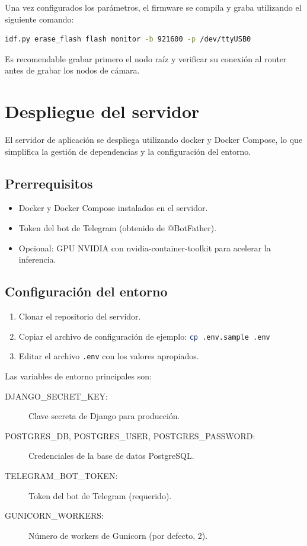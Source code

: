 \documentclass[a4paper, 12pt]{report}
\begin{document}
Una vez configurados los parámetros, el firmware se compila y graba
utilizando el siguiente comando:

\begin{lstlisting}[language=bash, caption={Comandos para compilar y grabar el firmware.}]
  idf.py erase_flash flash monitor -b 921600 -p /dev/ttyUSB0
\end{lstlisting}

Es recomendable grabar primero el nodo raíz y verificar su conexión al
router antes de grabar los nodos de cámara.

\section{Despliegue del servidor}

El servidor de aplicación se despliega utilizando \gls{docker} y
Docker Compose, lo que simplifica la gestión de dependencias y la
configuración del entorno.

\subsection{Prerrequisitos}

\begin{itemize}
  \item Docker y Docker Compose instalados en el servidor.
  \item Token del bot de Telegram (obtenido de @BotFather).
  \item Opcional: GPU NVIDIA con nvidia-container-toolkit para
    acelerar la inferencia.
\end{itemize}

\subsection{Configuración del entorno}

\begin{enumerate}
  \item Clonar el repositorio del servidor.
  \item Copiar el archivo de configuración de ejemplo:
    \lstinline[language=bash]{cp .env.sample .env}
  \item Editar el archivo \texttt{.env} con los valores apropiados.
\end{enumerate}

Las variables de entorno principales son:

\begin{description}
  \item[DJANGO\_SECRET\_KEY:] Clave secreta de Django para producción.
  \item[POSTGRES\_DB, POSTGRES\_USER, POSTGRES\_PASSWORD:] Credenciales
    de la base de datos PostgreSQL.
  \item[TELEGRAM\_BOT\_TOKEN:] Token del bot de Telegram (requerido).
  \item[GUNICORN\_WORKERS:] Número de workers de Gunicorn (por defecto, 2).
\end{description}
\end{document}

